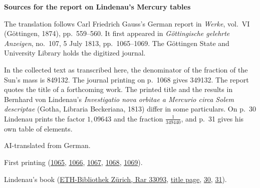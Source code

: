 \clearpage\thispagestyle{empty}
\begin{center}\Large\bfseries Sources for the report on Lindenau’s Mercury tables\end{center}

The translation follows Carl Friedrich Gauss’s German report in \emph{Werke}, vol.~VI (Göttingen, 1874), pp.~559--560. It first appeared in \emph{Göttingische gelehrte Anzeigen}, no.~107, 5 July 1813, pp.~1065--1069. The Göttingen State and University Library holds the digitized journal.

In the collected text as transcribed here, the denominator of the fraction of the Sun’s mass is 849132. The journal printing on p.~1068 gives 349132. The report quotes the title of a forthcoming work. The printed title and the results in Bernhard von Lindenau’s \emph{Investigatio nova orbitae a Mercurio circa Solem descriptae} (Gotha, Libraria Beckeriana, 1813) differ in some particulars. On p.~30 Lindenau prints the factor $1{,}09643$ and the fraction $\frac{1}{349440}$, and p.~31 gives his own table of elements.

AI-translated from German.

First printing (\href{https://images.p.sub.uni-goettingen.de/iiif/image/gdz:PPN319721507_1813:00001069/full/1650,/0/default.jpg}{1065}, \href{https://images.p.sub.uni-goettingen.de/iiif/image/gdz:PPN319721507_1813:00001070/full/1650,/0/default.jpg}{1066}, \href{https://images.p.sub.uni-goettingen.de/iiif/image/gdz:PPN319721507_1813:00001071/full/1650,/0/default.jpg}{1067}, \href{https://images.p.sub.uni-goettingen.de/iiif/image/gdz:PPN319721507_1813:00001072/full/1650,/0/default.jpg}{1068}, \href{https://images.p.sub.uni-goettingen.de/iiif/image/gdz:PPN319721507_1813:00001073/full/1650,/0/default.jpg}{1069}).

Lindenau’s book (\href{https://doi.org/10.3931/e-rara-72976}{ETH-Bibliothek Zürich, Rar 33093}, \href{https://www.e-rara.ch/i3f/v20/20184929/full/1650,/0/default.jpg}{title page}, \href{https://www.e-rara.ch/i3f/v20/20184958/full/1650,/0/default.jpg}{30}, \href{https://www.e-rara.ch/i3f/v20/20184959/full/1650,/0/default.jpg}{31}).

\clearpage
